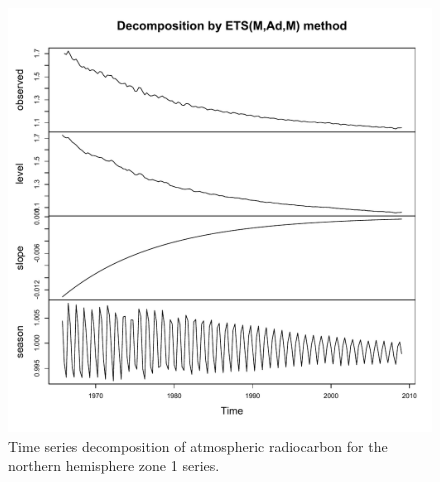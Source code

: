 \documentclass[draft,grl]{agutexSI}
\begin{document}
%
\begin{figure}[htbp]
   \centering
   \includegraphics[scale=0.7]{Figures/tsNHZ1} %
   \caption{Time series decomposition of atmospheric radiocarbon for the northern hemisphere zone 1 series. }
   \label{fig:tsNHZ1}
\end{figure}
\end{document}
